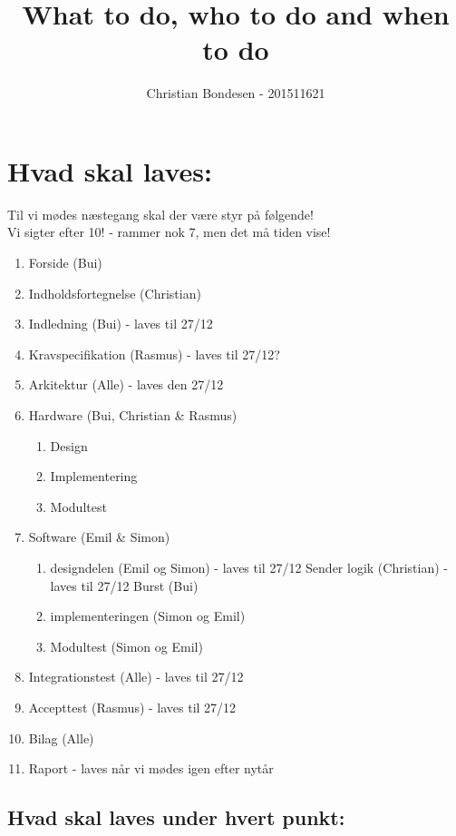 \documentclass[11pt]{article}
\title{What to do, who to do and when to do}
\author{Christian Bondesen - 201511621}
\begin{document}
\maketitle
\section{Hvad skal laves:}

Til vi mødes næstegang skal der være styr på følgende!\\
Vi sigter efter 10! - rammer nok 7, men det må tiden vise!

\begin{enumerate}
	\item Forside (Bui) \checkmark
	\item Indholdsfortegnelse (Christian) \checkmark
	\item Indledning (Bui) - laves til 27/12
	\item Kravspecifikation (Rasmus) - laves til 27/12?
	\item Arkitektur (Alle) - laves den 27/12
	
	\item Hardware (Bui, Christian \& Rasmus)
	\begin{enumerate}
		\item Design 
		\item Implementering
		\item Modultest
	\end{enumerate}

	\item Software (Emil \& Simon)
	\begin{enumerate}
		\item designdelen (Emil og Simon) - laves til 27/12
		\subitem Sender logik (Christian) - laves til 27/12
		\subitem Burst (Bui)
		\item implementeringen (Simon og Emil)
		\item Modultest (Simon og Emil)
	\end{enumerate}
	\item Integrationstest (Alle) - laves til 27/12
	\item Accepttest (Rasmus) - laves til 27/12
	\item Bilag (Alle) 
	\item Raport - laves når vi mødes igen efter nytår
\end{enumerate}

\subsection{Hvad skal laves under hvert punkt: }
\end{document}
